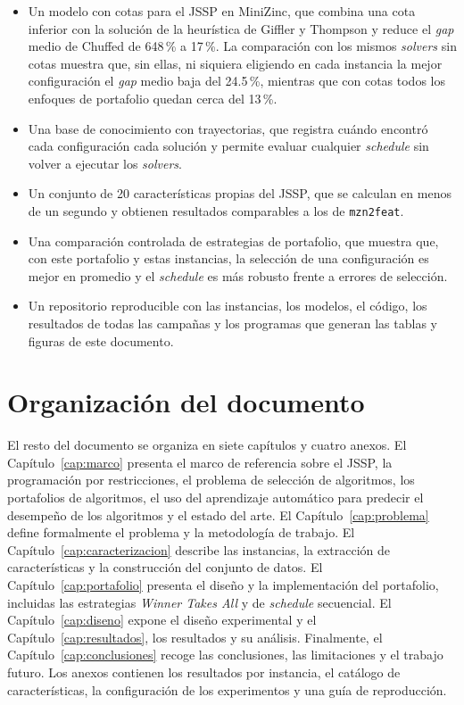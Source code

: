 \begin{itemize}
  \item Un modelo con cotas para el JSSP en MiniZinc, que combina una cota
    inferior con la solución de la heurística de Giffler y Thompson y reduce el
    \textit{gap} medio de Chuffed de 648\,\% a 17\,\%. La comparación con los
    mismos \textit{solvers} sin cotas muestra que, sin ellas, ni siquiera
    eligiendo en cada instancia la mejor configuración el \textit{gap} medio
    baja del 24.5\,\%, mientras que con cotas todos los enfoques de portafolio
    quedan cerca del 13\,\%.
  \item Una base de conocimiento con trayectorias, que registra cuándo encontró
    cada configuración cada solución y permite evaluar cualquier
    \textit{schedule} sin volver a ejecutar los \textit{solvers}.
  \item Un conjunto de 20 características propias del JSSP, que se calculan en
    menos de un segundo y obtienen resultados comparables a los de
    \texttt{mzn2feat}.
  \item Una comparación controlada de estrategias de portafolio, que muestra
    que, con este portafolio y estas instancias, la selección de una
    configuración es mejor en
    promedio y el \textit{schedule} es más robusto frente a errores de
    selección.
  \item Un repositorio reproducible con las instancias, los modelos, el código,
    los resultados de todas las campañas y los programas que generan las tablas
    y figuras de este documento.
\end{itemize}

\section{Organización del documento}
\label{sec:organizacion}

El resto del documento se organiza en siete capítulos y cuatro anexos. El
Capítulo~\ref{cap:marco} presenta el marco de referencia sobre el JSSP, la
programación por restricciones, el problema de selección de algoritmos, los
portafolios de algoritmos, el uso del aprendizaje automático para predecir el
desempeño de los algoritmos y el estado del arte. El
Capítulo~\ref{cap:problema} define formalmente el problema y la metodología de
trabajo. El Capítulo~\ref{cap:caracterizacion} describe las instancias, la
extracción de características y la construcción del conjunto de datos. El
Capítulo~\ref{cap:portafolio} presenta el diseño y la implementación del
portafolio, incluidas las estrategias \textit{Winner Takes All} y de
\textit{schedule} secuencial. El Capítulo~\ref{cap:diseno} expone el diseño
experimental y el Capítulo~\ref{cap:resultados}, los resultados y su análisis.
Finalmente, el Capítulo~\ref{cap:conclusiones} recoge las conclusiones, las
limitaciones y el trabajo futuro. Los anexos contienen los resultados por
instancia, el catálogo de características, la configuración de los
experimentos y una guía de reproducción.
